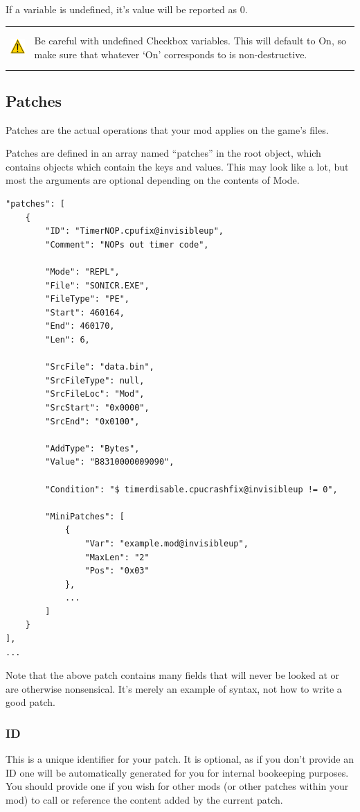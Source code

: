 \documentclass[12pt,a4paper,notitlepage]{article}
\newcommand{\warning}[1]{
    \begin{tabular}{m{1.1cm}  m{11cm}}
    &\\
    \includegraphics[width=1.1cm, height=1.1cm]{warning} & #1
    \\&\\
    \end{tabular}
}
\begin{document}
If a variable is undefined, it's value will be reported as 0.

\warning{Be careful with undefined Checkbox variables. This will default to On, so make sure that whatever `On' corresponds to is non-destructive.}

\subsection{Patches}
\label{subsec:create-patch}
Patches are the actual operations that your mod applies on the game's files.

Patches are defined in an array named ``patches'' in the root object, which contains objects which contain the keys and values. This may look like a lot, but most the arguments are optional depending on the contents of Mode.

\clearpage
\begin{lstlisting}[breaklines=true]
"patches": [
    {	
        "ID": "TimerNOP.cpufix@invisibleup",
        "Comment": "NOPs out timer code",
        
        "Mode": "REPL",
        "File": "SONICR.EXE",
        "FileType": "PE",
        "Start": 460164,
        "End": 460170,
        "Len": 6,
        
        "SrcFile": "data.bin",
        "SrcFileType": null,
        "SrcFileLoc": "Mod",
        "SrcStart": "0x0000",
        "SrcEnd": "0x0100",
        
        "AddType": "Bytes",
        "Value": "B8310000009090",
        
        "Condition": "$ timerdisable.cpucrashfix@invisibleup != 0",
        
        "MiniPatches": [
            {
                "Var": "example.mod@invisibleup",
                "MaxLen": "2"
                "Pos": "0x03"
            },
            ...
        ]
    }
],
...
\end{lstlisting}
Note that the above patch contains many fields that will never be looked at or are otherwise nonsensical. It's merely an example of syntax, not how to write a good patch.

\subsubsection{ID}
This is a unique identifier for your patch. It is optional, as if you don't provide an ID one will be automatically generated for you for internal bookeeping purposes. You should provide one if you wish for other mods (or other patches within your mod) to call or reference the content added by the current patch.
\end{document}
